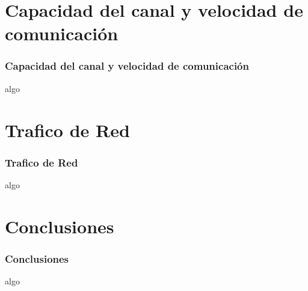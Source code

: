 \section{Capacidad del canal y velocidad de comunicaci\'on}
  \begin{frame}
    \frametitle{Capacidad del canal y velocidad de comunicaci\'on}
    algo
  \end{frame}
\section{Trafico de Red}
  \begin{frame}
    \frametitle{Trafico de Red}
    algo
  \end{frame}
\section{Conclusiones}
  \begin{frame}
    \frametitle{Conclusiones}
    algo
  \end{frame}
